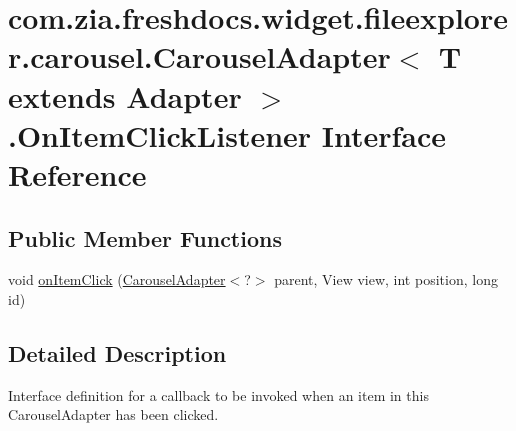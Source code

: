 \hypertarget{interfacecom_1_1zia_1_1freshdocs_1_1widget_1_1fileexplorer_1_1carousel_1_1_carousel_adapter_3_016aa018e3c29295f5f939e141af9765f4}{\section{com.\-zia.\-freshdocs.\-widget.\-fileexplorer.\-carousel.\-Carousel\-Adapter$<$ T extends Adapter $>$.On\-Item\-Click\-Listener Interface Reference}
\label{interfacecom_1_1zia_1_1freshdocs_1_1widget_1_1fileexplorer_1_1carousel_1_1_carousel_adapter_3_016aa018e3c29295f5f939e141af9765f4}
}
\subsection*{Public Member Functions}
\begin{DoxyCompactItemize}
\item 
void \hyperlink{interfacecom_1_1zia_1_1freshdocs_1_1widget_1_1fileexplorer_1_1carousel_1_1_carousel_adapter_3_016aa018e3c29295f5f939e141af9765f4_a4dec04c889037eba00545fc61d91d648}{on\-Item\-Click} (\hyperlink{classcom_1_1zia_1_1freshdocs_1_1widget_1_1fileexplorer_1_1carousel_1_1_carousel_adapter_3_01_t_01extends_01_adapter_01_4_a83aef3f3a9694fbc32954c4872b85911}{Carousel\-Adapter}$<$?$>$ parent, View view, int position, long id)
\end{DoxyCompactItemize}


\subsection{Detailed Description}
Interface definition for a callback to be invoked when an item in this Carousel\-Adapter has been clicked. 

